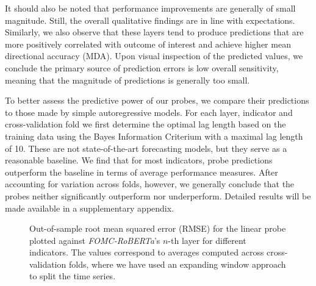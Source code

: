 \documentclass{article}
\theoremstyle{plain}
\theoremstyle{definition}
\theoremstyle{remark}
\begin{document}

It should also be noted that performance improvements are generally of small magnitude. Still, the overall qualitative findings are in line with expectations. Similarly, we also observe that these layers tend to produce predictions that are more positively correlated with outcome of interest and achieve higher mean directional accuracy (MDA). Upon visual inspection of the predicted values, we conclude the primary source of prediction errors is low overall sensitivity, meaning that the magnitude of predictions is generally too small. 

To better assess the predictive power of our probes, we compare their predictions to those made by simple autoregressive models. For each layer, indicator and cross-validation fold we first determine the optimal lag length based on the training data using the Bayes Information Criterium with a maximal lag length of 10. These are not state-of-the-art forecasting models, but they serve as a reasonable baseline. We find that for most indicators, probe predictions outperform the baseline in terms of average performance measures. After accounting for variation across folds, however, we generally conclude that the probes neither significantly outperform nor underperform. Detailed results will be made available in a supplementary appendix.


\begin{figure}


\caption{\label{fig-fomc}Out-of-sample root mean squared error (RMSE) for the linear probe plotted against \emph{FOMC-RoBERTa}'s \(n\)-th layer for different indicators. The values correspond to averages computed across cross-validation folds, where we have used an expanding window approach to split the time series.}

\end{figure}%
\end{document}
